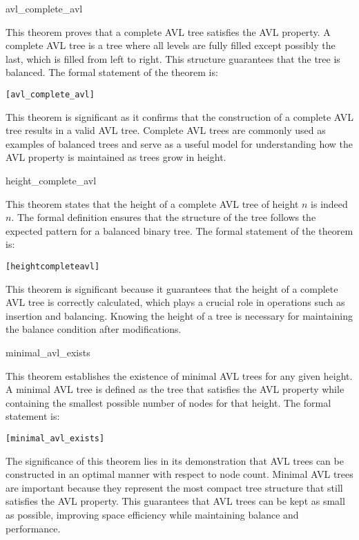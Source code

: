 	
	\begin{thm}{avl\_complete\_avl}

    This theorem proves that a complete AVL tree satisfies the AVL property. A complete AVL tree is a tree where all levels are fully filled except possibly the last, which is filled from left to right. This structure guarantees that the tree is balanced. The formal statement of the theorem is:
    
    \begin{alltt}
    	[avl_complete_avl]
    \end{alltt}
    
    
    
    \end{thm}

	This theorem is significant as it confirms that the construction of a complete AVL tree results in a valid AVL tree. Complete AVL trees are commonly used as examples of balanced trees and serve as a useful model for understanding how the AVL property is maintained as trees grow in height.
	
	\begin{thm}{height\_complete\_avl}

    This theorem states that the height of a complete AVL tree of height \( n \) is indeed \( n \). The formal definition ensures that the structure of the tree follows the expected pattern for a balanced binary tree. The formal statement of the theorem is:
    
    \begin{alltt}
    	[height complete avl]
    \end{alltt}
    
    
    \end{thm}

	This theorem is significant because it guarantees that the height of a complete AVL tree is correctly calculated, which plays a crucial role in operations such as insertion and balancing. Knowing the height of a tree is necessary for maintaining the balance condition after modifications.
	
	\begin{thm}{minimal\_avl\_exists}

    This theorem establishes the existence of minimal AVL trees for any given height. A minimal AVL tree is defined as the tree that satisfies the AVL property while containing the smallest possible number of nodes for that height. The formal statement is:
    
    \begin{alltt}
    	[minimal_avl_exists]
    \end{alltt}
    
    
    \end{thm}
    The significance of this theorem lies in its demonstration that AVL trees can be constructed in an optimal manner with respect to node count. Minimal AVL trees are important because they represent the most compact tree structure that still satisfies the AVL property. This guarantees that AVL trees can be kept as small as possible, improving space efficiency while maintaining balance and performance.
    

